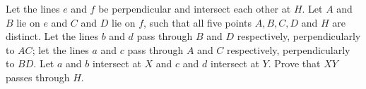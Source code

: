 Let the lines $e$ and $f$ be perpendicular and intersect each other at $H$. Let $A$ and $B$ lie on $e$ and $C$ and $D$ lie on $f$,  such that all five points $A,B,C,D$ and $H$ are distinct. Let the lines $b$ and $d$ pass through $B$ and $D$ respectively, perpendicularly to $AC$; let the lines $a$ and $c$ pass through $A$ and $C$ respectively, perpendicularly to $BD$. Let $a$ and $b$ intersect at $X$ and $c$ and $d$ intersect at $Y$. Prove that $XY$ passes through $H$.
